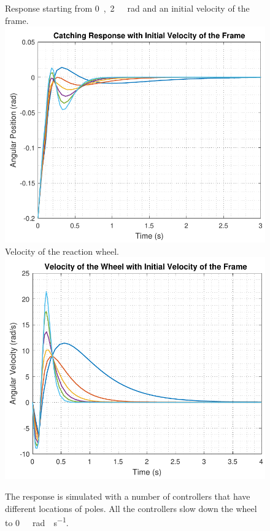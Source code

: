 \begin{figure}[H]
	\begin{minipage}{\linewidth}
		\captionsetup[subfigure]{font = footnotesize}
		\centering
		\subcaptionbox
		{
			Response starting from \si{0,2\ rad} and an initial velocity of the frame.
			\label{catchingStateSpace}
		}
		{
			\includegraphics[scale=.55]{figures/catchingStateSpace}
		}\quad
		\subcaptionbox
		{
			Velocity of the reaction wheel.
			\label{catchingStateSpaceWheel}
		}
		{
			\includegraphics[scale=.55]{figures/catchingStateSpaceWheel}
		}
		\caption{The response is simulated with a number of controllers that have different locations of poles. All the controllers slow down the wheel to \si{0\ rad \cdot s^{-1}}.}
		\label{catchingStateSpaceFrameAndWheel}
	\end{minipage}
\end{figure}\vspace{-18pt}
